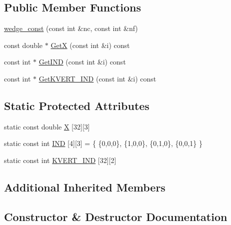 \subsection*{Public Member Functions}
\begin{DoxyCompactItemize}
\item 
\mbox{\hyperlink{classfemus_1_1wedge__const_a3a214a3dd7a99c8f35bc39dd725138a4}{wedge\+\_\+const}} (const int \&nc, const int \&nf)
\item 
const double $\ast$ \mbox{\hyperlink{classfemus_1_1wedge__const_a40c858d58d224e133433cf3c071b0acb}{GetX}} (const int \&i) const
\item 
const int $\ast$ \mbox{\hyperlink{classfemus_1_1wedge__const_a46e874c0a6d178ba0fbfa4169419c2f7}{Get\+I\+ND}} (const int \&i) const
\item 
const int $\ast$ \mbox{\hyperlink{classfemus_1_1wedge__const_a5b8d6664b44889cea478a6c5c68126d1}{Get\+K\+V\+E\+R\+T\+\_\+\+I\+ND}} (const int \&i) const
\end{DoxyCompactItemize}
\subsection*{Static Protected Attributes}
\begin{DoxyCompactItemize}
\item 
static const double \mbox{\hyperlink{classfemus_1_1wedge__const_af0e0f33a2a30353d2dad4b72ec656e5d}{X}} \mbox{[}32\mbox{]}\mbox{[}3\mbox{]}
\item 
static const int \mbox{\hyperlink{classfemus_1_1wedge__const_a1222d3859d119f7bb56b560e5e3fee65}{I\+ND}} \mbox{[}4\mbox{]}\mbox{[}3\mbox{]} = \{ \{0,0,0\}, \{1,0,0\}, \{0,1,0\}, \{0,0,1\} \}
\item 
static const int \mbox{\hyperlink{classfemus_1_1wedge__const_a87778c6ccf60bb71443151bdb4c77e67}{K\+V\+E\+R\+T\+\_\+\+I\+ND}} \mbox{[}32\mbox{]}\mbox{[}2\mbox{]}
\end{DoxyCompactItemize}
\subsection*{Additional Inherited Members}


\subsection{Constructor \& Destructor Documentation}
\mbox{\label{classfemus_1_1wedge__const_a3a214a3dd7a99c8f35bc39dd725138a4}} 

